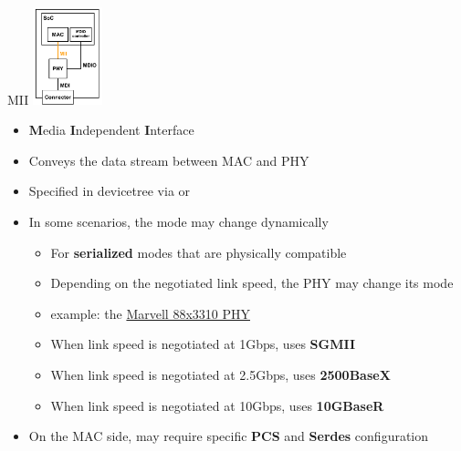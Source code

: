 \begin{frame}{MII}
	\hfill
	\includegraphics[width=0.15\textwidth]{slides/networking-driver-phy/mii.pdf}
	\vspace{-3cm}
	\begin{itemize}
		\item \textbf{M}edia \textbf{I}ndependent \textbf{I}nterface
		\item Conveys the data stream between MAC and PHY
		\item Specified in devicetree via  or 
		\item In some scenarios, the mode may change dynamically
			\begin{itemize}
				\item For \textbf{serialized} modes that are physically compatible
				\item Depending on the negotiated link speed, the PHY may change its mode
				\item example: the \href{https://elixir.bootlin.com/linux/v6.15.1/source/drivers/net/phy/marvell10g.c}{Marvell 88x3310 PHY}
				\item When link speed is negotiated at 1Gbps, uses \textbf{SGMII}
				\item When link speed is negotiated at 2.5Gbps, uses \textbf{2500BaseX}
				\item When link speed is negotiated at 10Gbps, uses \textbf{10GBaseR}
			\end{itemize}
		\item On the MAC side, may require specific \textbf{PCS} and \textbf{Serdes} configuration
	\end{itemize}
\end{frame}

